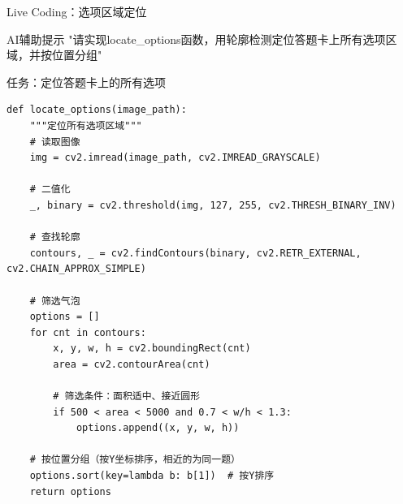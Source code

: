 \begin{frame}[fragile]{Live Coding：选项区域定位}
    \begin{block}{AI辅助提示}
        \aihint{} "请实现locate_options函数，用轮廓检测定位答题卡上所有选项区域，并按位置分组"
    \end{block}

    \begin{block}{任务：定位答题卡上的所有选项}
    \begin{lstlisting}[basicstyle=\ttfamily\scriptsize]
def locate_options(image_path):
    """定位所有选项区域"""
    # 读取图像
    img = cv2.imread(image_path, cv2.IMREAD_GRAYSCALE)

    # 二值化
    _, binary = cv2.threshold(img, 127, 255, cv2.THRESH_BINARY_INV)

    # 查找轮廓
    contours, _ = cv2.findContours(binary, cv2.RETR_EXTERNAL, cv2.CHAIN_APPROX_SIMPLE)

    # 筛选气泡
    options = []
    for cnt in contours:
        x, y, w, h = cv2.boundingRect(cnt)
        area = cv2.contourArea(cnt)

        # 筛选条件：面积适中、接近圆形
        if 500 < area < 5000 and 0.7 < w/h < 1.3:
            options.append((x, y, w, h))

    # 按位置分组（按Y坐标排序，相近的为同一题）
    options.sort(key=lambda b: b[1])  # 按Y排序
    return options
    \end{lstlisting}
    \end{block}
\end{frame}
